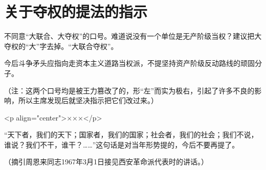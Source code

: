\section[关于夺权的提法的指示（一九六七年二月二十七日）]{关于夺权的提法的指示}


不同意“大联合、大夺权”的口号。难道说没有一个单位是无产阶级当权？建议把大夺权的“大”字去掉。“大联合夺权”。

今后斗争矛头应指向走资本主义道路当权派，不提坚持资产阶级反动路线的顽固分子。

（注：这两个口号均是被王力篡改了的，形“左”而实为极右，引起了许多不良的影响，所以主席发现后就坚决指示把它们改过来。）

<p align="center">×××</p>

“天下者，我们的天下；国家者，我们的国家；社会者，我们的社会；我们不说，谁说？我们不干，谁干？……”这句话是对当年形势提的，今后不要再提了。

{\raggedleft （摘引周恩来同志1967年3月1日接见西安革命派代表时的讲话。）\par}


